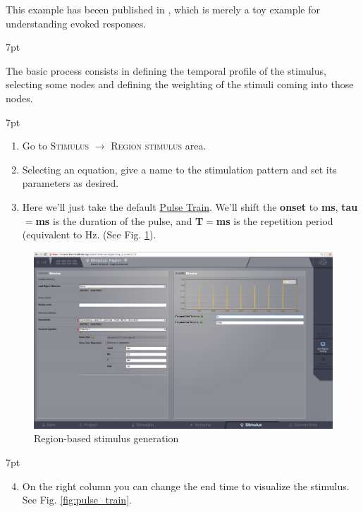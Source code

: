 \documentclass{tufte-handout}
\newenvironment{formal}{%
  \def\FrameCommand{%
    \hspace{1pt}%
    {\color{DarkBlue}\vrule width 2pt}%
    {\color{formalshade}\vrule width 4pt}%
    \colorbox{formalshade}%
  }%
  \MakeFramed{\advance\hsize-\width\FrameRestore}%
  \noindent\hspace{-4.55pt}%
  \begin{adjustwidth}{}{7pt}%
  \vspace{2pt}\vspace{2pt}%
}
{%
  \vspace{2pt}\end{adjustwidth}\endMakeFramed%
}
\newenvironment{blah}{%
  \def\FrameCommand{%
    \hspace{1pt}%
    {\color{DarkOrange}\vrule width 2pt}%
    {\color{PeachPuff}\vrule width 4pt}%
    \colorbox{PeachPuff}%
  }%
  \MakeFramed{\advance\hsize-\width\FrameRestore}%
  \noindent\hspace{-4.55pt}%
  \begin{adjustwidth}{}{7pt}%
  \vspace{2pt}\vspace{2pt}%
}
{%
  \vspace{2pt}\end{adjustwidth}\endMakeFramed%
}
\begin{document}
This example has beeen published in \citep{Sanz-Leon_2013}, which is merely a
toy example for understanding evoked responses.

\begin{blah}
The basic process consists in defining the temporal profile of the stimulus,  selecting some nodes and defining the weighting of the stimuli coming
into those nodes.
\end{blah}

\begin{formal}
\begin{enumerate}
\item Go to \textsc{Stimulus} $\rightarrow$ \textsc{Region stimulus} area. 
\item Selecting an equation, give a name to the stimulation pattern and set its parameters as desired.
\item Here we'll just take the default \underline{Pulse Train}. We'll shift the \textbf{onset} to \textbf{ \unit[500]{ms}}, \textbf{tau}$\mathbf{=}$\textbf{\unit[5]{ms}} is the duration of the pulse, and \textbf{T}$\mathbf{=}$\textbf{\unit[500]{ms}} is the repetition period (equivalent to \unit[2]{Hz}.  (See Fig. \ref{fig:stimulus_region}).
\end{enumerate}
\end{formal}

\begin{figure}[h]
  \includegraphics[width=\linewidth]{Handout_UI_HeterogenousModelAndStimulation_StimulusRegion}%
  \caption{Region-based stimulus generation}%
  \label{fig:stimulus_region}%
\end{figure}




\begin{formal}
\begin{enumerate}[resume]
\setcounter{enumi}{3}
\item On the right column you can change the end time to visualize the stimulus. See Fig. \ref{fig:pulse_train}.
\end{enumerate}
\end{formal}
\end{document}
